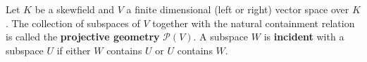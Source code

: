 Let $K$ be a skewfield and $V$ a finite dimensional (left or right) vector space over $K$. The collection of subspaces of $V$ together with the natural containment relation is called the \textbf{projective geometry} $\mathcal{P}(V)$. A subspace $W$ is \textbf{incident} with a subspace $U$ if either $W$ contains $U$ or $U$ contains $W$.
